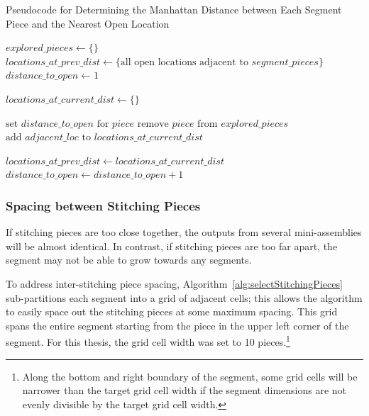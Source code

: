 \begin{algorithm}[tb]
\caption{Pseudocode for Determining the Manhattan Distance between Each Segment Piece and the Nearest Open Location}\label{alg:findDistanceToOpen}
\begin{algorithmic}[1]
    \State $explored\_pieces \gets \{ \}$
    \State $locations\_at\_prev\_dist \gets \{ \text{all open locations adjacent to } segment\_pieces \}$
    \State $distance\_to\_open \gets 1$
\item[]
     \label{op:distanceRoundWhileLoop}
        \State $locations\_at\_current\_dist \gets \{ \}$
\item[]
        		
        			\State $\text{set } distance\_to\_open \text{ for } piece$
        			\State $\text{remove } piece \text{ from } explored\_pieces$
        			\State $\text{add } adjacent\_loc \text{ to } locations\_at\_current\_dist$
        		\EndIf
        	\EndFor
        \EndFor
\item[]
    \State $locations\_at\_prev\_dist \gets locations\_at\_current\_dist$
    \State $distance\_to\_open \gets distance\_to\_open + 1$
    \EndWhile
\EndProcedure
\end{algorithmic}
\end{algorithm}


\subsubsection{Spacing between Stitching Pieces}\label{sec:spacingBetweenStitchingPieces}

If stitching pieces are too close together, the outputs from several mini-assemblies will be almost identical.  In contrast, if stitching pieces are too far apart, the segment may not be able to grow towards any segments.

To address inter-stitching piece spacing, Algorithm~\ref{alg:selectStitchingPieces} sub-partitions each segment into a grid of adjacent cells; this allows the algorithm to easily space out the stitching pieces at some maximum spacing.  This grid spans the entire segment starting from the piece in the upper left corner of the segment.  For this thesis, the grid cell width was set to 10 pieces.\footnote{Along the bottom and right boundary of the segment, some grid cells will be narrower than the target grid cell width if the segment dimensions are not evenly divisible by the target grid cell width.} 

